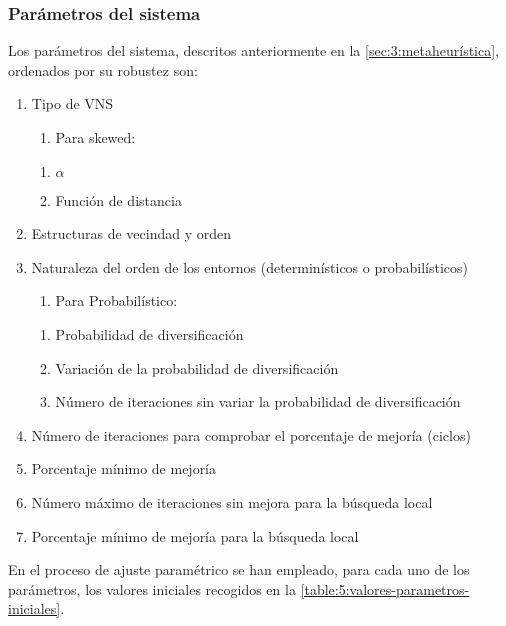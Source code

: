 \subsubsection{Parámetros del sistema} \label{sec:5:parametros-sistema}
Los parámetros del sistema, descritos anteriormente en la \autoref{sec:3:metaheurística}, ordenados por su robustez son:
\begin{enumerate}
	\item Tipo de VNS
	\begin{enumerate}[label={},left=-1pt]
		\item Para skewed:
	\end{enumerate}
	\begin{enumerate}[label*={\arabic*}]
		\item $\alpha$
		\item Función de distancia 
	\end{enumerate}
	\item Estructuras de vecindad y orden
	\item Naturaleza del orden de los entornos (determinísticos o probabilísticos)
	\begin{enumerate}[label={},left=-1pt]
		\item Para Probabilístico:
	\end{enumerate}
	\begin{enumerate}[label*={\arabic*}]
		\item Probabilidad de diversificación
		\item Variación de la probabilidad de diversificación 
		\item Número de iteraciones sin variar la probabilidad de diversificación 
	\end{enumerate}
	\item Número de iteraciones para comprobar el porcentaje de mejoría (ciclos)
	\item Porcentaje mínimo de mejoría
	\item Número máximo de iteraciones sin mejora para la búsqueda local
	\item Porcentaje mínimo de mejoría para la búsqueda local
\end{enumerate}

En el proceso de ajuste paramétrico se han empleado, para cada uno de los parámetros, los valores iniciales recogidos en la \autoref{table:5:valores-parametros-iniciales}.

